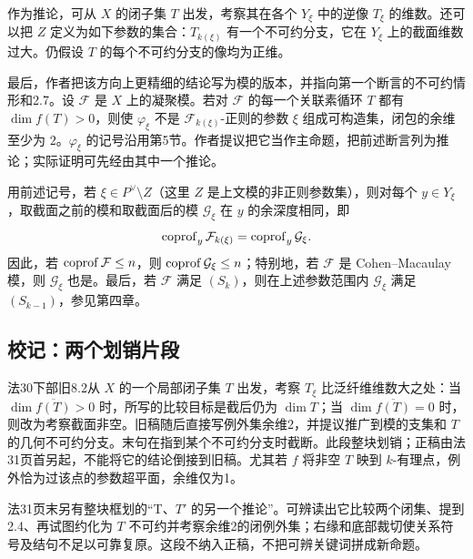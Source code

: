 作为推论，可从 $X$ 的闭子集 $T$ 出发，考察其在各个 $Y_\xi$ 中的逆像 $T_\xi$ 的维数。还可以把 $Z$ 定义为如下参数的集合：$T_{k(\xi)}$ 有一个不可约分支，它在 $Y_\xi$ 上的截面维数过大。仍假设 $T$ 的每个不可约分支的像均为正维。

最后，作者把该方向上更精细的结论写为模的版本，并指向第一个断言的不可约情形和2.7。设 $\mathcal F$ 是 $X$ 上的凝聚模。若对 $\mathcal F$ 的每一个关联素循环 $T$ 都有 $\dim f(T)>0$，则使 $\varphi_\xi$ 不是 $\mathcal F_{k(\xi)}$-正则的参数 $\xi$ 组成可构造集，闭包的余维至少为 $2$。$\varphi_\xi$ 的记号沿用第5节。作者提议把它当作主命题，把前述断言列为推论；实际证明可先经由其中一个推论。

用前述记号，若 $\xi\in P^\vee\setminus Z$（这里 $Z$ 是上文模的非正则参数集），则对每个 $y\in Y_\xi$，取截面之前的模和取截面后的模 $\mathcal G_\xi$ 在 $y$ 的余深度相同，即
\[
 \operatorname{coprof}_y\mathcal F_{k(\xi)}=\operatorname{coprof}_y\mathcal G_\xi .
\]
因此，若 $\operatorname{coprof}\mathcal F\le n$，则 $\operatorname{coprof}\mathcal G_\xi\le n$；特别地，若 $\mathcal F$ 是 Cohen--Macaulay 模，则 $\mathcal G_\xi$ 也是。最后，若 $\mathcal F$ 满足 $(S_k)$，则在上述参数范围内 $\mathcal G_\xi$ 满足 $(S_{k-1})$，参见第四章。
\subsection*{校记：两个划销片段}
法30下部旧8.2从 $X$ 的一个局部闭子集 $T$ 出发，考察 $T_\xi$ 比泛纤维维数大之处：当 $\dim\overline{f(T)}>0$ 时，所写的比较目标是截后仍为 $\dim T$；当 $\dim\overline{f(T)}=0$ 时，则改为考察截面非空。旧稿随后直接写例外集余维2，并提议推广到模的支集和 $T$ 的几何不可约分支。末句在指到某个不可约分支时截断。此段整块划销；正稿由法31页首另起，不能将它的结论倒接到旧稿。尤其若 $f$ 将非空 $T$ 映到 $k$-有理点，例外恰为过该点的参数超平面，余维仅为1。

法31页末另有整块框划的“T、$T'$ 的另一个推论”。可辨读出它比较两个闭集、提到2.4、再试图约化为 $T$ 不可约并考察余维2的闭例外集；右缘和底部裁切使关系符号及结句不足以可靠复原。这段不纳入正稿，不把可辨关键词拼成新命题。
\endgroup
